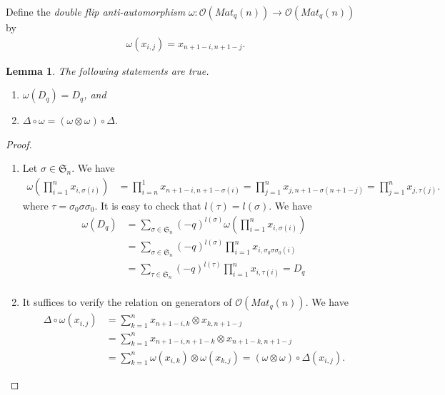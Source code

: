 \documentclass[table,a4paper,reqno]{amsart}
\numberwithin{equation}{section}
\newtheorem{lemma}[theorem]{Lemma}
\theoremstyle{definition}
\begin{document}
Define the \textit{double flip anti-automorphism} $\omega:\mathcal{O}(Mat_q(n))\rightarrow \mathcal{O}(Mat_q(n))$ by
\begin{align}\label{eq:3.52}
    \omega(x_{i,j})=x_{n+1-i,n+1-j}.
\end{align}
\begin{lemma}\label{lemma:3.9}
    The following statements are true.
    \begin{enumerate}
        \item[1] $\omega(D_q)=D_q$, and
        \item[2] $\Delta\circ\omega=(\omega\otimes\omega)\circ\Delta$. 
    \end{enumerate}
\end{lemma}
\begin{proof}
    \begin{enumerate}
        \item[1] Let $\sigma\in\mathfrak{S}_n$. We have
        \begin{equation}
        \begin{split}
            \omega\left(\prod_{i=1}^nx_{i,\sigma(i)}\right)&=\prod_{i=n}^1x_{n+1-i,n+1-\sigma(i)}=\prod_{j=1}^nx_{j,n+1-\sigma(n+1-j)}=\prod_{j=1}^nx_{j,\tau(j)}.
        \end{split}
        \end{equation}
        where $\tau=\sigma_0\sigma\sigma_0$. It is easy to check that $l(\tau)=l(\sigma)$. We have
        \begin{equation}
            \begin{split}
                \omega(D_q)&=\sum_{\sigma\in\mathfrak{S}_n}(-q)^{l(\sigma)}\omega\left(\prod_{i=1}^nx_{i,\sigma(i)}\right)\\
                &=\sum_{\sigma\in\mathfrak{S}_n}(-q)^{l(\sigma)}\prod_{i=1}^nx_{i,\sigma_0\sigma\sigma_0(i)}\\
                &=\sum_{\tau\in\mathfrak{S}_n}(-q)^{l(\tau)}\prod_{i=1}^nx_{i,\tau(i)}=D_q\\
            \end{split}
        \end{equation}
        \item[2] It suffices to verify the relation on generators of $\mathcal{O}(Mat_q(n))$. We have
        \begin{equation}
        \begin{split}
            \Delta\circ\omega(x_{i,j})&=\sum_{k=1}^n x_{n+1-i,k}\otimes x_{k,n+1-j}\\
            &=\sum_{k=1}^n x_{n+1-i,n+1-k}\otimes x_{n+1-k,n+1-j}\\
            &=\sum_{k=1}^n \omega(x_{i,k})\otimes \omega(x_{k,j})=(\omega\otimes\omega)\circ\Delta(x_{i,j}).
        \end{split}
    \end{equation}
    \end{enumerate}
\end{proof}
\end{document}
